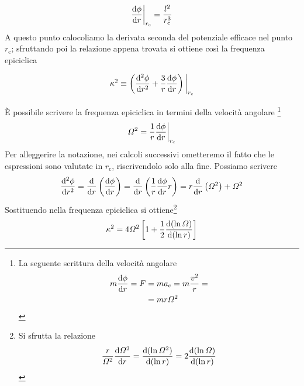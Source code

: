 \begin{equation}
\dfrac{\mathrm{d} {\phi}}{\mathrm{d} {r}} \bigg|_{r_\mathrm{c}} = \dfrac{l^2}{r_\mathrm{c}^3}
\end{equation}
A questo punto calocoliamo la derivata seconda del potenziale efficace nel punto $r_\mathrm{c}$; sfruttando poi la relazione appena trovata si ottiene così la frequenza epiciclica
\begin{EQ}
\begin{equation}
\kappa^2 \equiv \left(\dfrac{\mathrm{d}^{2} {\phi}}{\mathrm{d} {r}^{2}}  + \dfrac{3}{r} \dfrac{\mathrm{d} {\phi}}{\mathrm{d} {r}}\right) \bigg|_{r_\mathrm{c}}
\end{equation}
\end{EQ} 
È possibile scrivere la frequenza epiciclica in termini della velocità angolare \footnote{La seguente scrittura della velocità angolare \begin{align*}
m \dfrac{\mathrm{d} {\phi}}{\mathrm{d} {r}} = F &= m a_\mathrm{c} = m \dfrac{v^2}{r} = \\
&= m r \Omega^2  
\end{align*} }
\begin{equation}
\Omega^2 = \dfrac{1}{r} \dfrac{\mathrm{d} {\phi}}{\mathrm{d} {r}} \bigg|_{r_\mathrm{c}}
\end{equation}
Per alleggerire la notazione, nei calcoli successivi ometteremo il fatto che le espressioni sono valutate in $r_\mathrm{c}$, riscrivendolo solo alla fine. Possiamo scrivere
\begin{align*}
\dfrac{\mathrm{d}^{2} {\phi}}{\mathrm{d} {r}^{2}} = \dfrac{\mathrm{d} {}}{\mathrm{d} {r}}\left(\dfrac{\mathrm{d} {\phi}}{\mathrm{d} {r}}\right) = \dfrac{\mathrm{d} {}}{\mathrm{d} {r}}\left(\dfrac{1}{r}\dfrac{\mathrm{d} {\phi}}{\mathrm{d} {r}}r\right) = r\dfrac{\mathrm{d} {}}{\mathrm{d} {r}}\left(\Omega^2\right)+\Omega^2
\end{align*}
Sostituendo nella frequenza epiciclica si ottiene\footnote{Si sfrutta la relazione
\begin{align*}
\dfrac{r}{\Omega^2} \dfrac{\mathrm{d} {\Omega^2}}{\mathrm{d} {r}} = \dfrac{\mathrm{d} {(\ln\Omega^2)}}{\mathrm{d} {(\ln r)}} = 2 \dfrac{\mathrm{d} {(\ln\Omega)}}{\mathrm{d} {(\ln r)}}
\end{align*}}
\begin{equation}
\kappa^2 = 4 \Omega^2 \left[1+\dfrac{1}{2}\dfrac{\mathrm{d} {(\ln\Omega)}}{\mathrm{d} {(\ln r)}} \right]
\end{equation}
